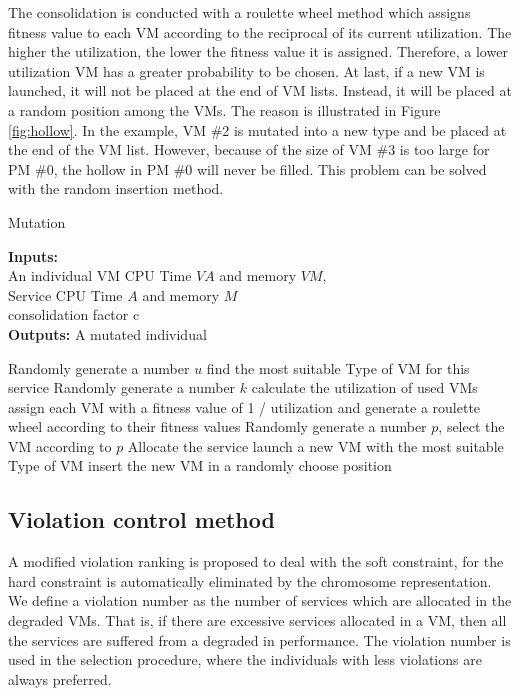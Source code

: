 The consolidation is conducted with a roulette wheel method which assigns fitness value to each VM according to the reciprocal of its current utilization. 
The higher the utilization, the lower the fitness value
it is assigned. 
Therefore, a lower utilization VM has a greater probability to be chosen. 
At last, if a new VM is launched, it will not be placed at the end of VM lists. Instead, it will be placed at a random position among the VMs. The reason is illustrated in Figure \ref{fig:hollow}. In the example, VM \#2 is mutated into a new type and be placed at the end of the VM list. However, because of the size of VM \#3 is too large for PM \#0, the hollow in PM \#0 will never be filled. This problem can be solved with the random insertion method.
\begin{algorithm}[!htb]
 \caption{Mutation}
 \footnotesize
 \textbf{Inputs:} \\
  An individual
  VM CPU Time $VA$ and memory $VM$, \\
  Service CPU Time $A$ and memory $M$ \\
  consolidation factor c \\
 \textbf{Outputs:}
  A mutated individual

 \begin{algorithmic}[1]
    \STATE Randomly generate a number $u$
      \STATE find the most suitable Type of VM for this service
      \STATE Randomly generate a number $k$
        \STATE calculate the utilization of used VMs
        \STATE assign each VM with a fitness value of 1 / utilization and generate a roulette wheel
            according to their fitness values
        \STATE Randomly generate a number $p$, select the VM according to $p$
        \STATE Allocate the service
      \ELSE
        \STATE launch a new VM with the most suitable Type of VM 
        \STATE insert the new VM in a randomly choose position
      \ENDIF
    \ENDIF
  \ENDFOR
 \end{algorithmic}
 \label{alg:mutation}
\end{algorithm}

\subsection{Violation control method}
A modified violation ranking is proposed to deal with the soft constraint, for the hard constraint is automatically eliminated by the chromosome representation.
We define a violation number as the number of services which are allocated in the degraded VMs. 
That is, if there are excessive services allocated in a VM, then all the services are suffered from a degraded in performance. 
The violation number is used in the selection procedure, 
where the individuals with less violations are always preferred.

